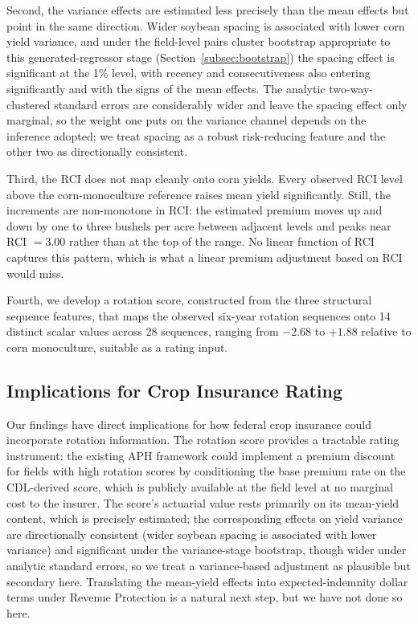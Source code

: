 \documentclass[12pt,letterpaper]{article}
\theoremstyle{remark}
\theoremstyle{remark}
\theoremstyle{plain}
\theoremstyle{definition}
\begin{document}
Second, the variance effects are estimated less precisely than the mean effects but point in the same direction. Wider soybean spacing is associated with lower corn yield variance, and under the field-level pairs cluster bootstrap appropriate to this generated-regressor stage (Section~\ref{subsec:bootstrap}) the spacing effect is significant at the 1\% level, with recency and consecutiveness also entering significantly and with the signs of the mean effects. The analytic two-way-clustered standard errors are considerably wider and leave the spacing effect only marginal, so the weight one puts on the variance channel depends on the inference adopted; we treat spacing as a robust risk-reducing feature and the other two as directionally consistent.
 
Third, the RCI does not map cleanly onto corn yields. Every observed RCI level above the corn-monoculture reference raises mean yield significantly. Still, the increments are non-monotone in RCI: the estimated premium moves up and down by one to three bushels per acre between adjacent levels and peaks near RCI $=3.00$ rather than at the top of the range. No linear function of RCI captures this pattern, which is what a linear premium adjustment based on RCI would miss.
 
Fourth, we develop a rotation score, constructed from the three structural sequence features, that maps the observed six-year rotation sequences onto 14 distinct scalar values across 28 sequences, ranging from $-2.68$ to $+1.88$ relative to corn monoculture, suitable as a rating input.
 
\subsection{\label{subsec:implications}Implications for Crop Insurance Rating}
 
Our findings have direct implications for how federal crop insurance could incorporate rotation information. The rotation score provides a tractable rating instrument: the existing APH framework could implement a premium discount for fields with high rotation scores by conditioning the base premium rate on the CDL-derived score, which is publicly available at the field level at no marginal cost to the insurer. The score's actuarial value rests primarily on its mean-yield content, which is precisely estimated; the corresponding effects on yield variance are directionally consistent (wider soybean spacing is associated with lower variance) and significant under the variance-stage bootstrap, though wider under analytic standard errors, so we treat a variance-based adjustment as plausible but secondary here. Translating the mean-yield effects into expected-indemnity dollar terms under Revenue Protection is a natural next step, but we have not done so here.
 
\end{document}
